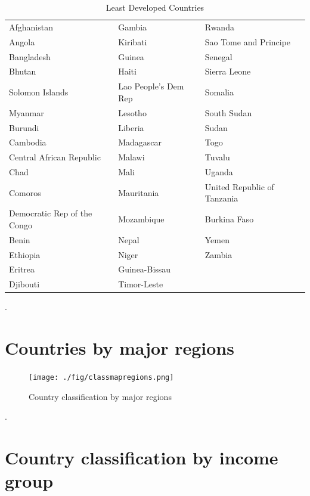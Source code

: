\documentclass[
  openany, nofonts]{tufte-book}
\begin{document}
\begin{table}[!h]

\caption{\label{tab:c99-LDCtab}Least Developed Countries}
\centering
\fontsize{10}{12}\selectfont
\begin{tabular}[t]{lll}
\toprule
Afghanistan & Gambia & Rwanda\\
Angola & Kiribati & Sao Tome and Principe\\
Bangladesh & Guinea & Senegal\\
Bhutan & Haiti & Sierra Leone\\
Solomon Islands & Lao People's Dem Rep & Somalia\\
Myanmar & Lesotho & South Sudan\\
Burundi & Liberia & Sudan\\
Cambodia & Madagascar & Togo\\
Central African Republic & Malawi & Tuvalu\\
Chad & Mali & Uganda\\
Comoros & Mauritania & United Republic of Tanzania\\
Democratic Rep of the Congo & Mozambique & Burkina Faso\\
Benin & Nepal & Yemen\\
Ethiopia & Niger & Zambia\\
Eritrea & Guinea-Bissau & \\
Djibouti & Timor-Leste & \\
\bottomrule
\end{tabular}
\end{table}

.
\clearpage\pagebreak

\hypertarget{countries-by-major-regions}{%
\section{Countries by major regions}\label{countries-by-major-regions}}

\begin{figure}
\texttt{[image: ./fig/classmapregions.png]} \caption[Country classification by major regions]{Country classification by major regions}\label{fig:c99-classmapregions}
\end{figure}

.
\pagebreak

\hypertarget{country-classification-by-income-group}{%
\section{Country classification by income group}\label{country-classification-by-income-group}}
\end{document}
